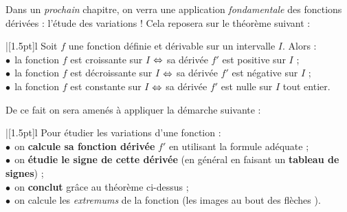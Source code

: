 \documentclass[a4paper,11pt]{article}
\begin{document}
\pagebreak


\begin{cidee}
{\small Dans un \textit{prochain} chapitre, on verra une application \textit{fondamentale} des fonctions dérivées : l'étude des variations ! Cela reposera sur le théorème suivant :

\smallskip

\hspace{5mm}%
\begin{tblr}{|[1.5pt]l}
	Soit $f$ une fonction définie et dérivable sur un intervalle $I$. Alors : \\
	\hspace{5mm}$\bullet~~$la fonction $f$ est croissante sur $I$ $\Leftrightarrow$ sa dérivée $f'$ est positive sur $I$ ; \\
	\hspace{5mm}$\bullet~~$la fonction $f$ est décroissante sur $I$ $\Leftrightarrow$ sa dérivée $f'$ est négative sur $I$ ; \\
	\hspace{5mm}$\bullet~~$la fonction $f$ est constante sur $I$ $\Leftrightarrow$ sa dérivée $f'$ est nulle sur $I$ tout entier. \\
\end{tblr}

\smallskip

De ce fait on sera amenés à appliquer la démarche suivante :

\smallskip

\hspace{5mm}%
\begin{tblr}{|[1.5pt]l}
	Pour étudier les variations d'une fonction : \\
	\hspace{5mm}$\bullet~~$on \textbf{calcule sa fonction dérivée} $f'$ en utilisant la formule adéquate ; \\
	\hspace{5mm}$\bullet~~$on \textbf{étudie le signe de cette dérivée} (en général en faisant un \textbf{tableau de signes}) ; \\
	\hspace{5mm}$\bullet~~$on \textbf{conclut} grâce au théorème ci-dessus ; \\
	\hspace{5mm}$\bullet~~$on calcule les \textit{extremums} de la fonction (les images au \og bout des flèches \fg). \\
\end{tblr}}
\end{cidee}
\end{document}
